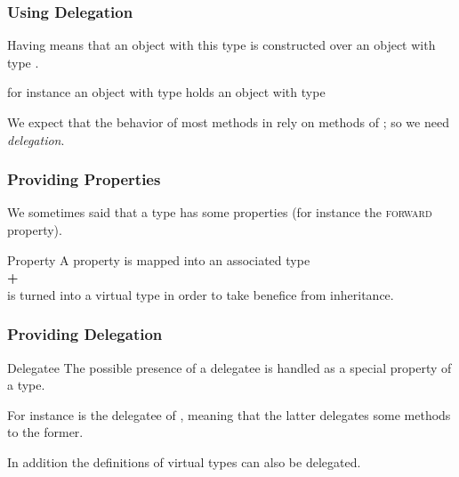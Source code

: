 \begin{frame}
  \frametitle{Using Delegation}

  Having \bffT means that an object with this type is constructed over
  an object with type \bfT.

  \bigskip

  {\scriptsize for instance an object with type
    \bfreversearrayiteratorT holds an object with type
    \bfarrayiteratorT }

  \bigskip

  We expect that the behavior of most methods in \bffT rely on methods
  of \bfT; so we need \textit{delegation}.

\end{frame}



\begin{frame}
  \frametitle{Providing Properties}

  We sometimes said that a type has some properties (for instance the
  \textsc{forward} property).

\bigskip

\begin{block}{Property}
  A property is mapped into an associated type\\
  \textbf{+} \\
  is turned into a virtual type in order to take benefice from
  inheritance.
\end{block}

\end{frame}



\begin{frame}
  \frametitle{Providing Delegation}

\begin{block}{Delegatee}
  The possible presence of a delegatee is handled as a special
  property of a type.
\end{block}

\bigskip

For instance \bfI is the delegatee of \bfreverseI, meaning that the
latter delegates some methods to the former.

\bigskip

In addition the definitions of virtual types can also be delegated.

\end{frame}




